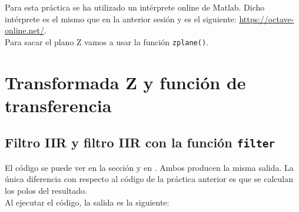 \documentclass[11pt,a4paper]{article}
\begin{document}
\tableofcontents
\thispagestyle{empty}

\newpage

Para esta práctica se ha utilizado un intérprete online de Matlab. Dicho intérprete es el mismo que en la anterior sesión y es el siguiente: \color{blue} \url{https://octave-online.net/}\color{black}.\\

Para sacar el plano Z vamos a usar la función \texttt{zplane()}.

\section{Transformada Z y función de transferencia}
\subsection{Filtro IIR y filtro IIR con la función \texttt{filter}}

	El código se puede ver en la sección \color{deepred}\color{black} y en \color{deepred}\color{black}. Ambos producen la misma salida. La única diferencia con respecto al código de la práctica anterior es que se calculan los polos del resultado.\\
	
	Al ejecutar el código, la salida es la siguiente:
	
\end{document}
